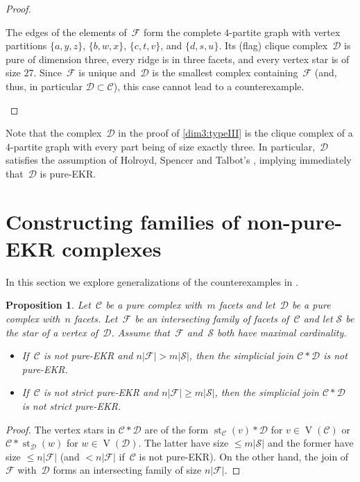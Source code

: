 \documentclass[a4paper,12pt]{amsart}
\theoremstyle{plain}
\newtheorem{proposition}[theorem]{Proposition}
\theoremstyle{definition}
\newcommand{\C}{\mathcal C}
\newcommand{\D}{\mathcal D}
\newcommand{\family}{\mathcal F}
\newcommand{\smallfamily}{\mathcal S}
\DeclareMathOperator{\st}{st}
\DeclareMathOperator{\vertices}{V}
\begin{document}
\begin{proof}
\begin{enumerate}
The edges of the elements of~$\family$ form the complete $4$-partite graph with vertex partitions $\{a,y,z\}$, $\{b,w,x\}$, $\{c,t,v\}$, and $\{d,s,u\}$. Its (flag) clique complex~$\D$ is pure of dimension three, every ridge is in three facets, and every vertex star is of size $27$. Since~$\family$ is unique and~$\D$ is the smallest complex containing~$\family$ (and, thus, in particular $\D \subset \C$), this case cannot lead to a counterexample.
\qedhere
\end{enumerate}
\end{proof}

Note that the complex~$\D$ in the proof of \eqref{dim3:typeIII} is the clique complex of a $4$-partite graph with every part being of size exactly three.
In particular,~$\D$ satisfies the assumption of Holroyd, Spencer and Talbot's , implying immediately that~$\D$ is pure-EKR.

\section{Constructing families of non-pure-EKR complexes}
\label{sec:examples}

In this section we explore generalizations of the counterexamples in .

\begin{proposition}
\label{lem:join}
  Let~$\C$ be a pure complex with~$m$ facets and let~$\D$ be a pure complex with~$n$ facets.
  Let~$\family$ be an intersecting family of facets of~$\C$ and let $\smallfamily$ be the star of a vertex of~$\D$.
  Assume that~$\family$ and~$\smallfamily$ both have maximal cardinality.
  \begin{itemize}
    \item If~$\C$ is not        pure-EKR and $n|\family| >   m|\smallfamily|$, then the simplicial join $\C \ast \D$ is not        pure-EKR.
    \item If~$\C$ is not strict pure-EKR and $n|\family| \ge m|\smallfamily|$, then the simplicial join $\C \ast \D$ is not strict pure-EKR.
  \end{itemize}
\end{proposition}

\begin{proof}
  The vertex stars in $\C \ast \D$ are of the form $\st_\C (v) * \D$ for $v \in \vertices(\C)$ or $\C \ast \st_\D (w)$ for $w \in \vertices(\D)$. The
   latter have size $\le m|\smallfamily|$ and the former have size $\le n|\family|$ (and $<n|\family|$ if~$\C$ is not pure-EKR).
   On the other hand, the join of~$\family$ with~$\D$ forms an intersecting family of size $n|\family|$.
\end{proof}
\end{document}
